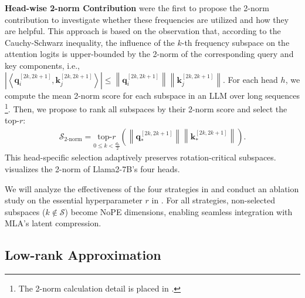 \textbf{Head-wise 2-norm Contribution} 
\citet{corr/abs-2410-06205} were the first to propose the 2-norm contribution to investigate whether these frequencies are utilized and how they are helpful. 
This approach is based on the observation that, according to the Cauchy-Schwarz inequality, the influence of the \( k \)-th frequency subspace on the attention logits is upper-bounded by the 2-norm of the corresponding query and key components, i.e., $\left|\left\langle\mathbf{q}_i^{[2k,2k+1]}, \mathbf{k}_j^{[2k,2k+1]}\right\rangle\right| \leqslant\left\|\mathbf{q}_i^{[2k,2k+1]}\right\|\left\|\mathbf{k}_j^{[2k,2k+1]}\right\|$.
For each head \( h \), we compute the mean 2-norm score for each subspace in an LLM over long sequences
\footnote{
The 2-norm calculation detail is placed in .
}.
Then, we propose to rank all subspaces by their 2-norm score and select the top-$r$:
\begin{align*}
    \mathcal{S}_{\text{2-norm}}\!=\!\underset{0\le k<\frac{d_h}{2}}{\text{top-}r} \left( \left\|\mathbf{q}_*^{[2k,2k+1]}\right\|\left\|\mathbf{k}_*^{[2k,2k+1]}\right\| \right).
\end{align*}
This head-specific selection adaptively preserves rotation-critical subspaces.
 visualizes the 2-norm of  Llama2-7B's four heads.

We will analyze the effectiveness of the four strategies in  and conduct an ablation study on the essential hyperparameter $r$ in .
For all strategies, non-selected subspaces (\( k \notin \mathcal{S} \)) become NoPE dimensions, enabling seamless integration with MLA's latent compression.


\subsection{Low-rank Approximation}
\label{sec:low_rank_appro}



